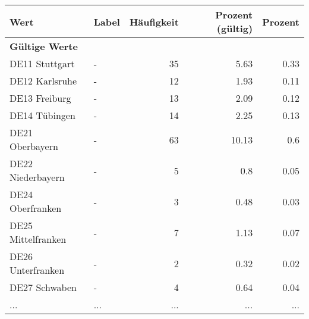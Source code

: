      \begin{longtable}{Xlrrr}
     \toprule
     \textbf{Wert} & \textbf{Label} & \textbf{Häufigkeit} & \textbf{Prozent (gültig)} & \textbf{Prozent} \\
     \endhead
     \midrule
     \multicolumn{5}{l}{\textbf{Gültige Werte}}\\
        \multicolumn{1}{X}{DE11 Stuttgart} & - & \num{35} & \num[round-mode=places,round-precision=2]{5.63} & \num[round-mode=places,round-precision=2]{0.33} \\
        \multicolumn{1}{X}{DE12 Karlsruhe} & - & \num{12} & \num[round-mode=places,round-precision=2]{1.93} & \num[round-mode=places,round-precision=2]{0.11} \\
        \multicolumn{1}{X}{DE13 Freiburg} & - & \num{13} & \num[round-mode=places,round-precision=2]{2.09} & \num[round-mode=places,round-precision=2]{0.12} \\
        \multicolumn{1}{X}{DE14 Tübingen} & - & \num{14} & \num[round-mode=places,round-precision=2]{2.25} & \num[round-mode=places,round-precision=2]{0.13} \\
        \multicolumn{1}{X}{DE21 Oberbayern} & - & \num{63} & \num[round-mode=places,round-precision=2]{10.13} & \num[round-mode=places,round-precision=2]{0.6} \\
        \multicolumn{1}{X}{DE22 Niederbayern} & - & \num{5} & \num[round-mode=places,round-precision=2]{0.8} & \num[round-mode=places,round-precision=2]{0.05} \\
        \multicolumn{1}{X}{DE24 Oberfranken} & - & \num{3} & \num[round-mode=places,round-precision=2]{0.48} & \num[round-mode=places,round-precision=2]{0.03} \\
        \multicolumn{1}{X}{DE25 Mittelfranken} & - & \num{7} & \num[round-mode=places,round-precision=2]{1.13} & \num[round-mode=places,round-precision=2]{0.07} \\
        \multicolumn{1}{X}{DE26 Unterfranken} & - & \num{2} & \num[round-mode=places,round-precision=2]{0.32} & \num[round-mode=places,round-precision=2]{0.02} \\
        \multicolumn{1}{X}{DE27 Schwaben} & - & \num{4} & \num[round-mode=places,round-precision=2]{0.64} & \num[round-mode=places,round-precision=2]{0.04} \\
       ... & ... & ... & ... & ... \\

\end{longtable}
